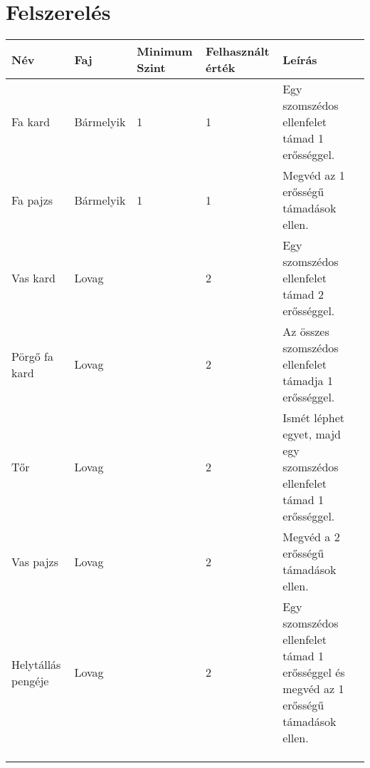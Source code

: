 \section{Felszerelés}

\begin{longtabu} to \textwidth {X[2l]|X[1.5l]|X[1.2c]|X[1.3c]|X[5l]}
	\rowfont[c]{\small}Név           & Faj     & Minimum Szint & Felhasznált érték & Leírás                                                                 \\ \hline \endhead
	Fa kard       & Bármelyik & 1             & 1                 & Egy szomszédos ellenfelet támad 1 erősséggel.                          \\
	Fa pajzs      & Bármelyik & 1             & 1                 & Megvéd az 1 erősségű támadások ellen.                                  \\
	Vas kard      & Lovag     &               & 2                 & Egy szomszédos ellenfelet támad 2 erősséggel.                          \\
	Pörgő fa kard & Lovag     &               & 2                 & Az összes szomszédos ellenfelet támadja 1 erősséggel.                  \\
	Tőr           & Lovag     &               & 2                 & Ismét léphet egyet, majd egy szomszédos ellenfelet támad 1 erősséggel. \\
	Vas pajzs& Lovag          &               & 2                  &  Megvéd a 2 erősségű támadások ellen.                                                                  \\
	Helytállás pengéje& Lovag          &               &  2                 & Egy szomszédos ellenfelet támad 1 erősséggel és megvéd az 1 erősségű támadások ellen.                                                                        \\
	&           &               &                   &                                                                        \\
	&           &               &                   &                                                                        \\
	&           &               &                   &   
\end{longtabu}